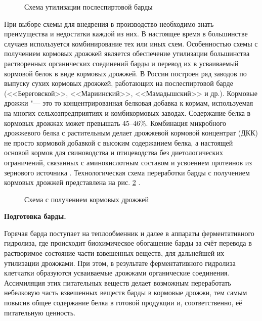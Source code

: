 \begin{figure} 
\centering 
\begin{small} 
\def\svgwidth{1\linewidth} 
 
\end{small} 
\caption{Схема утилизации послеспиртовой барды} 
\label{ShemaUtil} 
\end{figure}
 
При выборе схемы для внедрения в производство необходимо знать преимущества и недостатки каждой из них. 
В настоящее время в большинстве случаев используется комбинирование тех или иных схем. Особенностью схемы с получением кормовых дрожжей является обеспечение утилизации большинства растворенных органических соединений барды и перевод их в усваиваемый кормовой белок в виде кормовых дрожжей. 
В России построен ряд заводов по выпуску сухих кормовых дрожжей, работающих на послеспиртовой барде (<<Береговской>>, <<Мариинский>>, <<Мамадышский>> и др.). 
Кормовые дрожжи "--- это то концентрированная белковая добавка к кормам, используемая на многих сельхозпредприятиях и комбикормовых заводах. Содержание белка в кормовых дрожжах может превышать 45--46\%. 
Комбинация микробного дрожжевого белка с растительным делает дрожжевой кормовой концентрат (ДКК) не просто кормовой добавкой с высоким содержанием белка, а настоящей основой кормов для свиноводства и птицеводства без диетологических ограничений, связанных с аминокислотным составом и усвоением протеинов из зернового источника \cite{web_spbarda}. 
Технологическая схема переработки барды с получением кормовых дрожжей представлена на рис. \ref{ShemaUtil2} \cite{web_spbarda}. 

\begin{figure} 
\centering 
\begin{small} 
\def\svgwidth{0.8\linewidth} 
 
\end{small} 
\caption{Схема с получением кормовых дрожжей} 
\label{ShemaUtil2} 
\end{figure} 

\textbf{Подготовка барды.} 

Горячая барда поступает на теплообменник и далее в аппараты ферментативного гидролиза, где происходит биохимическое обогащение барды за счёт перевода в растворимое состояние части взвешенных веществ, для дальнейшей их утилизации дрожжами. При этом, в результате ферментативного гидролиза клетчатки образуются усваиваемые дрожжами органические соединения. 
Ассимиляция этих питательных веществ делает возможным переработать небелковую часть взвешенных веществ барды в кормовые дрожжи, тем самым повысив общее содержание белка в готовой продукции и, соответственно, её питательную ценность.
 

